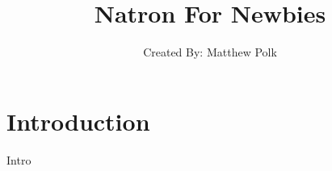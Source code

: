 \documentclass[12pt, oneside, openany, showtrims, letterpaper]{memoir}
\title{Natron For Newbies}
\author{Created By: Matthew Polk}
\date{}
\begin{document}
\maketitle

\newpage
\tableofcontents*
\pagestyle{empty}


\cleardoublepage

%
%
%
\setcounter{page}{1}
\chapter{Introduction}

Intro
\end{document}
